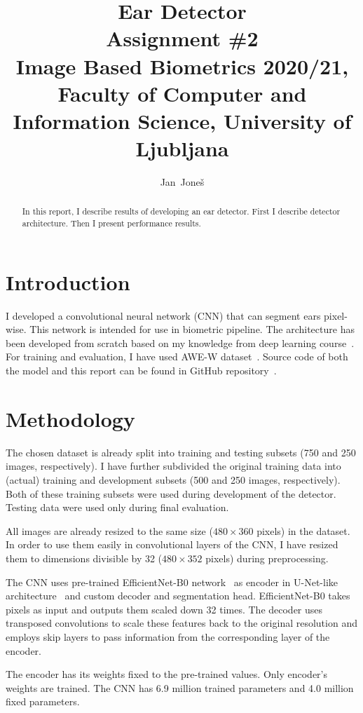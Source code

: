 \documentclass[9pt]{IEEEtran}
\title{\vspace{0ex} %
Ear Detector
\\ \large{Assignment \#2}\\ \normalsize{Image Based Biometrics 2020/21, Faculty of Computer and Information Science, University of Ljubljana}}
\author{ %
Jan~Joneš
\vspace{-4.0ex}
}
\begin{document}
\maketitle

\begin{abstract}
In this report, I describe results of developing an ear detector.
First I describe detector architecture.
Then I present performance results.
\end{abstract}

\section{Introduction}
I developed a convolutional neural network (CNN) that can segment ears pixel-wise.
This network is intended for use in biometric pipeline.
The architecture has been developed from scratch based on my knowledge from deep learning course~\cite{npfl114}.
For training and evaluation, I have used AWE-W dataset~\cite{awe}.
Source code of both the model and this report can be found in GitHub repository~\cite{repo}.

\section{Methodology}
The chosen dataset is already split into training and testing subsets (750 and 250 images, respectively).
I have further subdivided the original training data into (actual) training and development subsets (500 and 250 images, respectively).
Both of these training subsets were used during development of the detector.
Testing data were used only during final evaluation.

All images are already resized to the same size ($480 \times 360$ pixels) in the dataset.
In order to use them easily in convolutional layers of the CNN, I have resized them to dimensions divisible by 32 ($480 \times 352$ pixels) during preprocessing.

The CNN uses pre-trained EfficientNet-B0 network~\cite{efficientNet} as encoder in U-Net-like architecture~\cite{unet} and custom decoder and segmentation head.
EfficientNet-B0 takes pixels as input and outputs them scaled down 32 times. The decoder uses transposed convolutions to scale these features back to the original resolution and employs skip layers to pass information from the corresponding layer of the encoder.

The encoder has its weights fixed to the pre-trained values. Only encoder's weights are trained. The CNN has 6.9 million trained parameters and 4.0 million fixed parameters.
\end{document}
